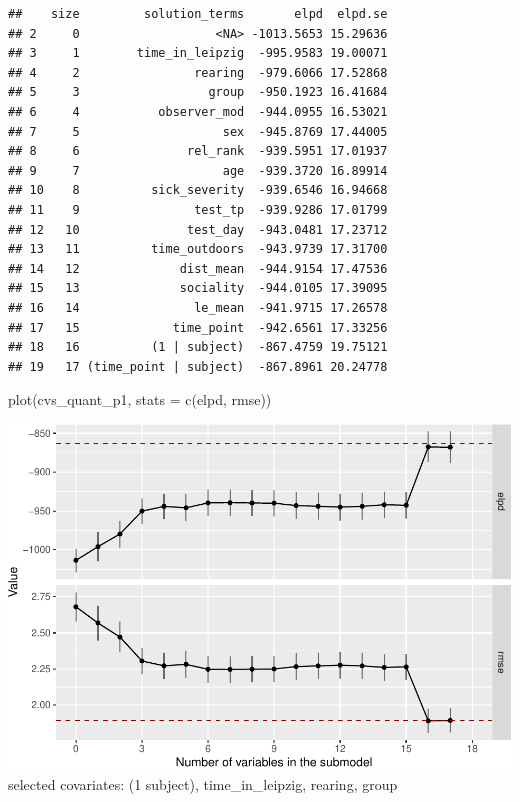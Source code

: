 \documentclass[
]{article}
\newenvironment{Shaded}{\begin{snugshade}}{\end{snugshade}}
\newcommand{\AttributeTok}[1]{\textcolor[rgb]{0.77,0.63,0.00}{#1}}
\newcommand{\FunctionTok}[1]{\textcolor[rgb]{0.00,0.00,0.00}{#1}}
\newcommand{\NormalTok}[1]{#1}
\newcommand{\StringTok}[1]{\textcolor[rgb]{0.31,0.60,0.02}{#1}}
\begin{document}
\begin{verbatim}
##    size         solution_terms       elpd  elpd.se
## 2     0                   <NA> -1013.5653 15.29636
## 3     1        time_in_leipzig  -995.9583 19.00071
## 4     2                rearing  -979.6066 17.52868
## 5     3                  group  -950.1923 16.41684
## 6     4           observer_mod  -944.0955 16.53021
## 7     5                    sex  -945.8769 17.44005
## 8     6               rel_rank  -939.5951 17.01937
## 9     7                    age  -939.3720 16.89914
## 10    8          sick_severity  -939.6546 16.94668
## 11    9                test_tp  -939.9286 17.01799
## 12   10               test_day  -943.0481 17.23712
## 13   11          time_outdoors  -943.9739 17.31700
## 14   12              dist_mean  -944.9154 17.47536
## 15   13              sociality  -944.0105 17.39095
## 16   14                le_mean  -941.9715 17.26578
## 17   15             time_point  -942.6561 17.33256
## 18   16          (1 | subject)  -867.4759 19.75121
## 19   17 (time_point | subject)  -867.8961 20.24778
\end{verbatim}

\begin{Shaded}
\begin{Highlighting}[]
\FunctionTok{plot}\NormalTok{(cvs\_quant\_p1, }\AttributeTok{stats =} \FunctionTok{c}\NormalTok{(}\StringTok{\textquotesingle{}elpd\textquotesingle{}}\NormalTok{, }\StringTok{\textquotesingle{}rmse\textquotesingle{}}\NormalTok{))}
\end{Highlighting}
\end{Shaded}

\includegraphics{PPI_analysis_final_files/figure-latex/unnamed-chunk-15-1.pdf}
selected covariates: (1 \textbar{} subject), time\_in\_leipzig, rearing, group
\end{document}
